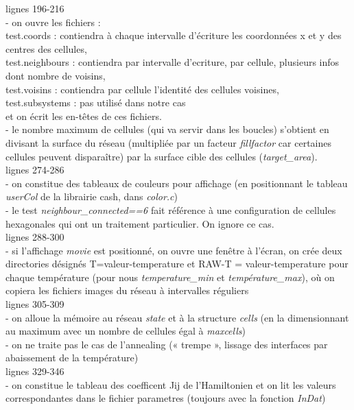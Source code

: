 \documentclass[11pt,a4paper]{article}
\begin{document}
lignes 196-216\\
- on ouvre les fichiers :\\
test.coords :  contiendra à chaque intervalle d’écriture les coordonnées x et y des centres des cellules,\\
test.neighbours : contiendra par intervalle d’ecriture, par cellule, plusieurs infos dont nombre de voisins, \\
test.voisins : contiendra par cellule l’identité des cellules voisines,\\
test.subsystems : pas utilisé dans notre cas\\

et on écrit les en-têtes de ces fichiers.\\

- le nombre maximum de cellules (qui va servir dans les boucles) s’obtient en divisant la surface du réseau (multipliée par un facteur \textit{fillfactor} car certaines cellules peuvent disparaître) par la surface cible des cellules (\textit{target\_area}).\\

lignes 274-286\\
- on constitue des tableaux de couleurs pour affichage (en positionnant le tableau \textit{userCol} de la librairie cash, dans \textit{color.c})\\
- le test \textit{neighbour\_connected==6} fait référence à une configuration de cellules hexagonales qui ont un traitement particulier. On ignore ce cas.\\

lignes 288-300\\
- si l’affichage \textit{movie} est positionné, on ouvre une fenêtre à l’écran, on crée deux directories désignés T=valeur-temperature et RAW-T = valeur-temperature pour chaque température (pour nous \textit{temperature\_min} et \textit{température\_max}), où on copiera les fichiers images du réseau à intervalles réguliers\\

lignes 305-309\\
- on alloue la mémoire au réseau \textit{state} et à la structure \textit{cells} (en la dimensionnant au maximum avec un nombre de cellules égal à \textit{maxcells})\\
- on ne traite pas le cas de l’annealing (« trempe », lissage des interfaces par abaissement de la température)\\

lignes 329-346\\
- on constitue le tableau des coefficent Jij de l’Hamiltonien et on lit les valeurs correspondantes dans le fichier parametres (toujours avec la fonction \textit{InDat})\\
\end{document}
